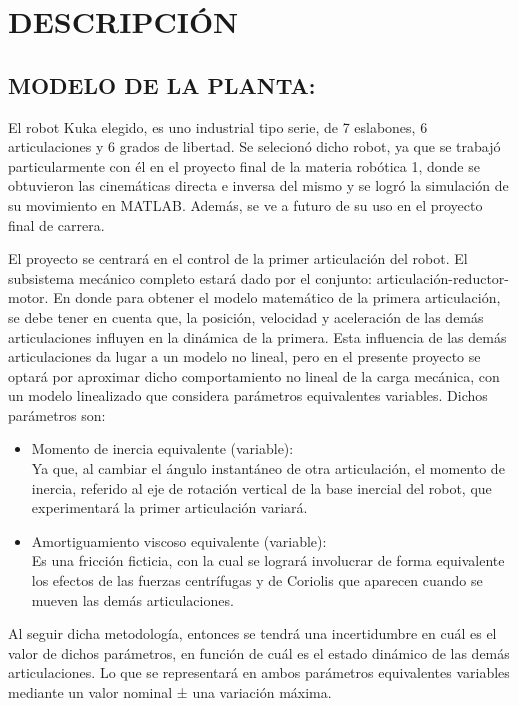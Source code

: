 \documentclass{article}
\begin{document}
\section{DESCRIPCIÓN}
\label{sec:DESCRIPCIÓN}


\subsection{MODELO DE LA PLANTA:}
\label{sec:MODELO DE LA PLANTA}

El robot Kuka elegido, es uno industrial tipo serie, de 7 eslabones, 6 articulaciones y 6 grados de libertad. Se selecionó dicho robot, ya que se trabajó particularmente con él en el proyecto final de la materia robótica 1, donde se obtuvieron las cinemáticas directa e inversa del mismo y se logró la simulación de su movimiento en MATLAB. Además, se ve a futuro de su uso en el proyecto final de carrera.

El proyecto se centrará en el control de la primer articulación del robot. El subsistema mecánico completo estará dado por el conjunto: articulación-reductor-motor. En donde para obtener el modelo matemático de la primera articulación, se debe tener en cuenta que, la posición, velocidad y aceleración de las demás articulaciones influyen en la dinámica de la primera. Esta influencia de las demás articulaciones da lugar a un modelo no lineal, pero en el presente proyecto se optará por aproximar dicho comportamiento no lineal de la carga mecánica, con un modelo linealizado que considera parámetros equivalentes variables. Dichos parámetros son:
\begin{itemize}
    \item Momento de inercia equivalente (variable):\\ Ya que, al cambiar el ángulo instantáneo de otra articulación, el momento de inercia, referido al eje de rotación vertical de la base inercial del robot, que experimentará la primer articulación variará.

    \item Amortiguamiento viscoso equivalente (variable):\\  Es una fricción ficticia, con la cual se logrará involucrar de forma equivalente los efectos de las fuerzas centrífugas y de Coriolis que aparecen cuando se mueven las demás articulaciones.
\end{itemize}

Al seguir dicha metodología, entonces se tendrá una incertidumbre en cuál es el valor de dichos parámetros, en función de cuál es el estado dinámico de las demás articulaciones. Lo que se representará en ambos parámetros equivalentes variables mediante un valor nominal ± una variación máxima.
\end{document}
